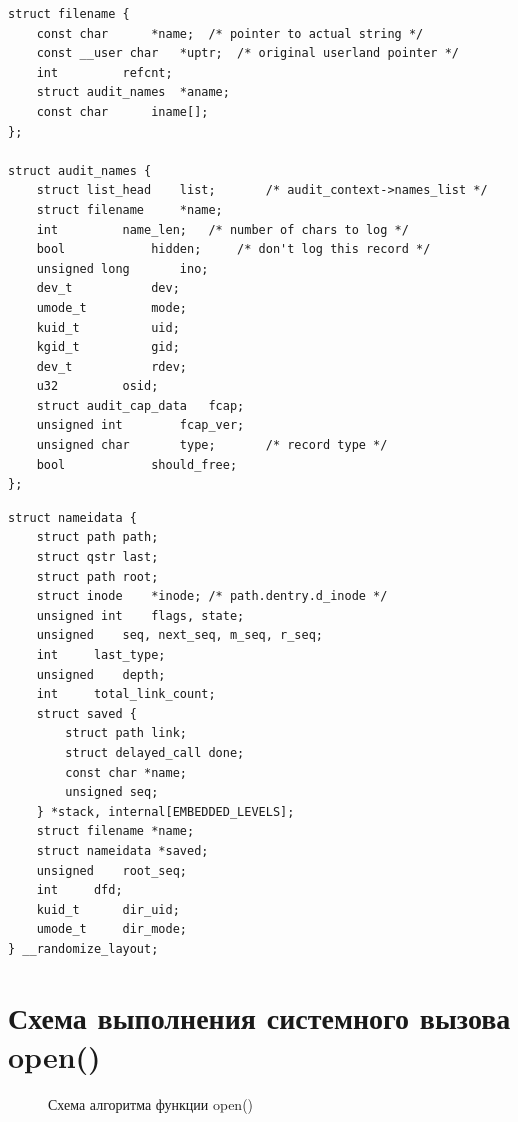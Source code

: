 \begin{lstlisting}[caption={Структура filename}, showstringspaces=false]
struct filename {
	const char		*name;	/* pointer to actual string */
	const __user char	*uptr;	/* original userland pointer */
	int			refcnt;
	struct audit_names	*aname;
	const char		iname[];
};

struct audit_names {
	struct list_head	list;		/* audit_context->names_list */
	struct filename		*name;
	int			name_len;	/* number of chars to log */
	bool			hidden;		/* don't log this record */
	unsigned long		ino;
	dev_t			dev;
	umode_t			mode;
	kuid_t			uid;
	kgid_t			gid;
	dev_t			rdev;
	u32			osid;
	struct audit_cap_data	fcap;
	unsigned int		fcap_ver;
	unsigned char		type;		/* record type */
	bool			should_free;
};
\end{lstlisting}

\clearpage

\begin{lstlisting}[caption={Структура nameidata}]
struct nameidata {
	struct path	path;
	struct qstr	last;
	struct path	root;
	struct inode	*inode; /* path.dentry.d_inode */
	unsigned int	flags, state;
	unsigned	seq, next_seq, m_seq, r_seq;
	int		last_type;
	unsigned	depth;
	int		total_link_count;
	struct saved {
		struct path link;
		struct delayed_call done;
		const char *name;
		unsigned seq;
	} *stack, internal[EMBEDDED_LEVELS];
	struct filename	*name;
	struct nameidata *saved;
	unsigned	root_seq;
	int		dfd;
	kuid_t		dir_uid;
	umode_t		dir_mode;
} __randomize_layout;
\end{lstlisting}


\chapter{Схема выполнения системного вызова open()}

\begin{figure}[H]
	\caption{Схема алгоритма функции open()}
\end{figure}


